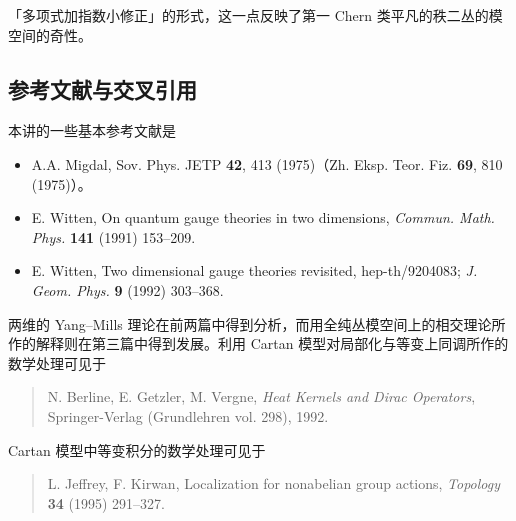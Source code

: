 

「多项式加指数小修正」的形式，这一点反映了第一 Chern 类平凡的秩二丛的模空间的奇性。

\subsection*{参考文献与交叉引用}

本讲的一些基本参考文献是
\begin{itemize}
  \item A.A. Migdal, Sov. Phys. JETP \textbf{42}, 413 (1975)（Zh. Eksp. Teor. Fiz. \textbf{69}, 810 (1975)）。
  \item E. Witten, On quantum gauge theories in two dimensions, \emph{Commun. Math. Phys.} \textbf{141} (1991) 153--209.
  \item E. Witten, Two dimensional gauge theories revisited, hep-th/9204083; \emph{J. Geom. Phys.} \textbf{9} (1992) 303--368.
\end{itemize}

两维的 Yang--Mills 理论在前两篇中得到分析，而用全纯丛模空间上的相交理论所作的解释则在第三篇中得到发展。利用 Cartan 模型对局部化与等变上同调所作的数学处理可见于
\begin{quote}
  N. Berline, E. Getzler, M. Vergne, \emph{Heat Kernels and Dirac Operators}, Springer-Verlag (Grundlehren vol. 298), 1992.
\end{quote}

Cartan 模型中等变积分的数学处理可见于
\begin{quote}
  L. Jeffrey, F. Kirwan, Localization for nonabelian group actions, \emph{Topology} \textbf{34} (1995) 291--327.
\end{quote}

